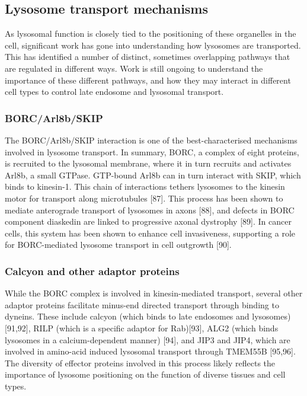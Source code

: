 \documentclass[
  12pt,
  a4paper,
]{book}
\begin{document}
\hypertarget{lysosome-transport-mechanisms}{%
\subsection{Lysosome transport mechanisms}\label{lysosome-transport-mechanisms}}

As lysosomal function is closely tied to the positioning of these organelles in the cell, significant work has gone into understanding how lysosomes are transported. This has identified a number of distinct, sometimes overlapping pathways that are regulated in different ways. Work is still ongoing to understand the importance of these different pathways, and how they may interact in different cell types to control late endosome and lysosomal transport.

\hypertarget{borcarl8bskip}{%
\subsubsection{BORC/Arl8b/SKIP}\label{borcarl8bskip}}

The BORC/Arl8b/SKIP interaction is one of the best-characterised mechanisms involved in lysosome transport. In summary, BORC, a complex of eight proteins, is recruited to the lysosomal membrane, where it in turn recruits and activates Arl8b, a small GTPase. GTP-bound Arl8b can in turn interact with SKIP, which binds to kinesin-1. This chain of interactions tethers lysosomes to the kinesin motor for transport along microtubules {[}87{]}. This process has been shown to mediate anterograde transport of lysosomes in axons {[}88{]}, and defects in BORC component diaskedin are linked to progressive axonal dystrophy {[}89{]}. In cancer cells, this system has been shown to enhance cell invasiveness, supporting a role for BORC-mediated lysosome transport in cell outgrowth {[}90{]}.

\hypertarget{calcyon-and-other-adaptor-proteins}{%
\subsubsection{Calcyon and other adaptor proteins}\label{calcyon-and-other-adaptor-proteins}}

While the BORC complex is involved in kinesin-mediated transport, several other adaptor proteins facilitate minus-end directed transport through binding to dyneins. These include calcyon (which binds to late endosomes and lysosomes) {[}91,92{]}, RILP (which is a specific adaptor for Rab){[}93{]}, ALG2 (which binds lysosomes in a calcium-dependent manner) {[}94{]}, and JIP3 and JIP4, which are involved in amino-acid induced lysosomal transport through TMEM55B {[}95,96{]}. The diversity of effector proteins involved in this process likely reflects the importance of lysosome positioning on the function of diverse tissues and cell types.
\end{document}
